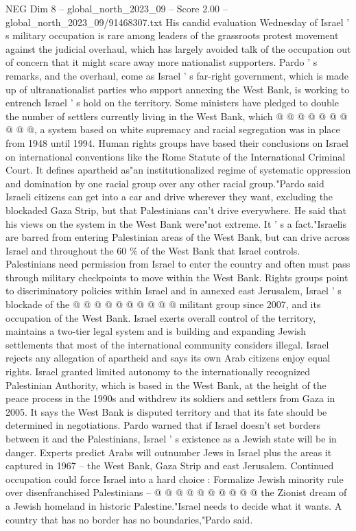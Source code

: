 \begin{textsample}{NEG Dim 8 – global\_north\_2023\_09 – Score 2.00 – global\_north\_2023\_09/91468307.txt}
His candid evaluation Wednesday of Israel ' s military occupation is rare among leaders of the grassroots protest movement against the judicial overhaul, which has largely avoided talk of the occupation out of concern that it might scare away more nationalist supporters.
Pardo ' s remarks, and the overhaul, come as Israel ' s far-right government, which is made up of ultranationalist parties who support annexing the West Bank, is working to entrench Israel ' s hold on the territory.
Some ministers have pledged to double the number of settlers currently living in the West Bank, which @ @ @ @ @ @ @ @ @ @, a system based on white supremacy and racial segregation was in place from 1948 until 1994.
Human rights groups have based their conclusions on Israel on international conventions like the Rome Statute of the International Criminal Court.
It defines apartheid as"an institutionalized regime of systematic oppression and domination by one racial group over any other racial group."Pardo said Israeli citizens can get into a car and drive wherever they want, excluding the blockaded Gaza Strip, but that Palestinians can't drive everywhere.
He said that his views on the system in the West Bank were"not extreme.
It ' s a fact."Israelis are barred from entering Palestinian areas of the West Bank, but can drive across Israel and throughout the 60 \% of the West Bank that Israel controls.
Palestinians need permission from Israel to enter the country and often must pass through military checkpoints to move within the West Bank.
Rights groups point to discriminatory policies within Israel and in annexed east Jerusalem, Israel ' s blockade of the @ @ @ @ @ @ @ @ @ @ militant group since 2007, and its occupation of the West Bank.
Israel exerts overall control of the territory, maintains a two-tier legal system and is building and expanding Jewish settlements that most of the international community considers illegal.
Israel rejects any allegation of apartheid and says its own Arab citizens enjoy equal rights.
Israel granted limited autonomy to the internationally recognized Palestinian Authority, which is based in the West Bank, at the height of the peace process in the 1990s and withdrew its soldiers and settlers from Gaza in 2005.
It says the West Bank is disputed territory and that its fate should be determined in negotiations.
Pardo warned that if Israel doesn't set borders between it and the Palestinians, Israel ' s existence as a Jewish state will be in danger.
Experts predict Arabs will outnumber Jews in Israel plus the areas it captured in 1967 -- the West Bank, Gaza Strip and east Jerusalem.
Continued occupation could force Israel into a hard choice : Formalize Jewish minority rule over disenfranchised Palestinians -- @ @ @ @ @ @ @ @ @ @ the Zionist dream of a Jewish homeland in historic Palestine."Israel needs to decide what it wants.
A country that has no border has no boundaries,"Pardo said.

\end{textsample}
